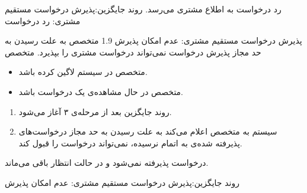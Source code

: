{{\begin{enumerate}
		\end{enumerate}
	}
	{
		رد درخواست به اطلاع مشتری می‌رسد.
	}
	{
		روند جایگزین:پذیرش درخواست مستقیم مشتری: رد درخواست
	}

	\alternativeflow
	{
		پذیرش درخواست مستقیم مشتری:  عدم امکان پذیرش
	}
	{1.9}
	{
 متخصص به علت رسیدن به حد مجاز پذیرش درخواست نمی‌تواند درخواست مشتری را بپذیرد.
	}
	{
		متخصص
	}
	{}
	{
		\begin{itemize}
			\vspace*{-0.6cm}
			\item 
			متخصص در سیستم لاگین کرده باشد.
			\item
			متخصص در حال مشاهده‌ی یک درخواست باشد.
		\end{itemize}
	}
	{
		\vspace*{-0.6cm}
		\begin{enumerate}
			\item 
			روند جایگزین بعد از مرحله‌ی ۳ آغاز می‌شود.
			\item
			سیستم به متخصص اعلام می‌کند به علت رسیدن به حد مجاز درخواست‌های پذیرفته شده‌ی به اتمام نرسیده، نمی‌تواند درخواست را قبول کند.
			
		\end{enumerate}
	}
	{
		درخواست پذیرفته نمی‌شود و در حالت انتظار باقی می‌ماند.

	}
	{
		روند جایگزین:پذیرش درخواست مستقیم مشتری: عدم امکان پذیرش
	}
}


